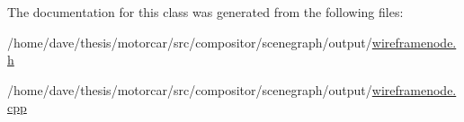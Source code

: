The documentation for this class was generated from the following files\-:\begin{DoxyCompactItemize}
\item 
/home/dave/thesis/motorcar/src/compositor/scenegraph/output/\hyperlink{wireframenode_8h}{wireframenode.\-h}\item 
/home/dave/thesis/motorcar/src/compositor/scenegraph/output/\hyperlink{wireframenode_8cpp}{wireframenode.\-cpp}\end{DoxyCompactItemize}
